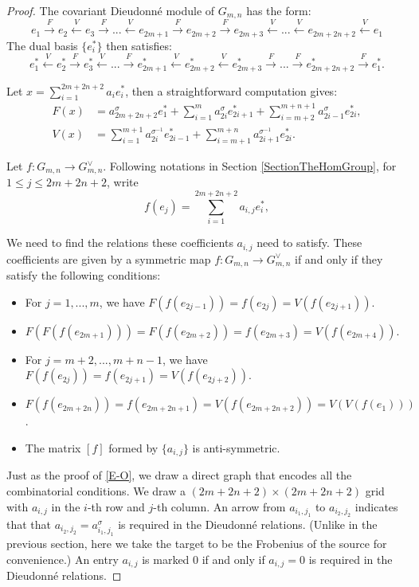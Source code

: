 \documentclass[a4paper,12pt,twoside]{report}
\begin{document}
\begin{proof}
    The covariant Dieudonné module of $G_{m,n}$ has the form: 
    \[e_1\xrightarrow{F}e_2\xleftarrow{V}e_3\xrightarrow{F}...\xleftarrow{V}e_{2m+1}\xrightarrow{F}e_{2m+2}\xrightarrow{F}e_{2m+3}\xleftarrow{V}...\xleftarrow{V}e_{2m+2n+2}\xleftarrow{V}e_1\]  
    The dual basis \(\{e_i^*\}\) then satisfies:
    \[e_1^*\xleftarrow{V}e_2^*\xrightarrow{F}e_3^*\xleftarrow{V}...\xrightarrow{F}e_{2m+1}^*\xleftarrow{V}e_{2m+2}^*\xleftarrow{V}e_{2m+3}^*\xrightarrow{F}...\xrightarrow{F}e_{2m+2n+2}^*\xrightarrow{F}e_1^*.\] 

    Let $x=\sum_{i=1}^{2m+2n+2}a_ie_i^*$, then a straightforward computation gives:
    \begin{equation}\label{GmnFV}
        \begin{aligned}
        F(x)&=a_{2m+2n+2}^\sigma e_1^*+\sum_{i=1}^m a_{2i}^\sigma e_{2i+1}^*+\sum_{i=m+2}^{m+n+1} a_{2i-1}^\sigma e_{2i}^*, \\
        V(x)&=\sum_{i=1}^{m+1} a_{2i}^{\sigma^{-1}}e_{2i-1}^*+\sum_{i=m+1}^{m+n} a_{2i+1}^{\sigma^{-1}}e_{2i}^*.
        \end{aligned}
    \end{equation}
    
    Let $f: G_{m,n}\rightarrow G_{m,n}^\vee$. 
    Following notations in Section \ref{SectionTheHomGroup}, 
    for $1\leqslant j\leqslant 2m+2n+2$, write 
    \[f(e_j)=\sum_{i=1}^{2m+2n+2} a_{i,j}e_i^*, \]

    We need to find the relations these coefficients $a_{i,j}$ need to satisfy. 
    These coefficients are given by a symmetric map $f: G_{m,n}\rightarrow G_{m,n}^\vee$ 
    if and only if they satisfy the following conditions: 
    \begin{itemize}
        \item For \(j=1,...,m\), we have \(F(f(e_{2j-1}))=f(e_{2j})=V(f(e_{2j+1})).\) 
        \item \(F(F(f(e_{2m+1})))=F(f(e_{2m+2}))=f(e_{2m+3})=V(f(e_{2m+4})).\)
        \item For \(j=m+2,...,m+n-1\), we have \(F(f(e_{2j}))=f(e_{2j+1})=V(f(e_{2j+2}))\).
        \item \(F(f(e_{2m+2n}))=f(e_{2m+2n+1})=V(f(e_{2m+2n+2}))=V(V(f(e_1)))\). 
        \item The matrix $[f]$ formed by $\{a_{i,j}\}$ is anti-symmetric.
    \end{itemize}

    Just as the proof of \ref{E-O}, we draw a direct graph that encodes all the combinatorial conditions. 
    We draw a $(2m+2n+2)\times(2m+2n+2)$ 
    grid with $a_{i,j}$ in the $i$-th row and $j$-th column. 
    An arrow from $a_{i_1,j_1}$ to $a_{i_2,j_2}$ indicates that
    that $a_{i_2,j_2}=a_{i_1,j_1}^\sigma$ is required in the Dieudonn\'e relations. 
    (Unlike in the previous section, here we take the target to be the Frobenius of the source for convenience.)
    An entry $a_{i,j}$ is marked $0$ if and only if $a_{i,j}=0$ 
    is required in the Dieudonné relations. 


\end{proof}
\end{document}
